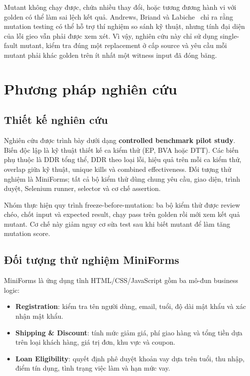 \documentclass[runningheads]{llncs}
\begin{document}
Mutant không chạy được, chứa nhiều thay đổi, hoặc tương đương hành vi với golden có thể làm sai lệch kết quả. Andrews, Briand và Labiche~\cite{andrews2005mutation} chỉ ra rằng mutation testing có thể hỗ trợ thí nghiệm so sánh kỹ thuật, nhưng tính đại diện của lỗi gieo vẫn phải được xem xét. Vì vậy, nghiên cứu này chỉ sử dụng single-fault mutant, kiểm tra đúng một replacement ở cấp source và yêu cầu mỗi mutant phải khác golden trên ít nhất một witness input đã đóng băng.

\section{Phương pháp nghiên cứu}
\label{sec:method}

\subsection{Thiết kế nghiên cứu}

Nghiên cứu được trình bày dưới dạng \textbf{controlled benchmark pilot study}. Biến độc lập là kỹ thuật thiết kế ca kiểm thử (EP, BVA hoặc DTT). Các biến phụ thuộc là DDR tổng thể, DDR theo loại lỗi, hiệu quả trên mỗi ca kiểm thử, overlap giữa kỹ thuật, unique kills và combined effectiveness. Đối tượng thử nghiệm là MiniForms; tất cả bộ kiểm thử dùng chung yêu cầu, giao diện, trình duyệt, Selenium runner, selector và cơ chế assertion.

Nhóm thực hiện quy trình freeze-before-mutation: ba bộ kiểm thử được review chéo, chốt input và expected result, chạy pass trên golden rồi mới xem kết quả mutant. Cơ chế này giảm nguy cơ sửa test sau khi biết mutant để làm tăng mutation score.

\subsection{Đối tượng thử nghiệm MiniForms}

MiniForms là ứng dụng tĩnh HTML/CSS/JavaScript gồm ba mô-đun business logic:
\begin{itemize}[leftmargin=*]
  \item \textbf{Registration}: kiểm tra tên người dùng, email, tuổi, độ dài mật khẩu và xác nhận mật khẩu.
  \item \textbf{Shipping \& Discount}: tính mức giảm giá, phí giao hàng và tổng tiền dựa trên loại khách hàng, giá trị đơn, khu vực và coupon.
  \item \textbf{Loan Eligibility}: quyết định phê duyệt khoản vay dựa trên tuổi, thu nhập, điểm tín dụng, tình trạng việc làm và hạn mức vay.
\end{itemize}
\end{document}
